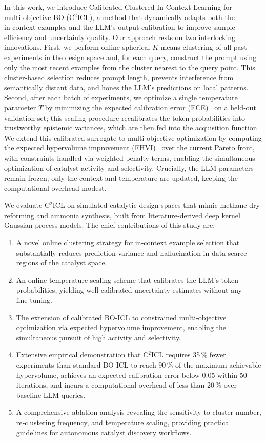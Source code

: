 \documentclass{article}
\begin{document}
In this work, we introduce Calibrated Clustered In‑Context Learning for multi‑objective BO (C$^2$ICL), a method that dynamically adapts both the in‑context examples and the LLM’s output calibration to improve sample efficiency and uncertainty quality. Our approach rests on two interlocking innovations. First, we perform online spherical $K$-means clustering of all past experiments in the design space and, for each query, construct the prompt using only the most recent examples from the cluster nearest to the query point. This cluster‑based selection reduces prompt length, prevents interference from semantically distant data, and hones the LLM’s predictions on local patterns. Second, after each batch of experiments, we optimize a single temperature parameter $T$ by minimizing the expected calibration error (ECE)~\cite{naeini2015obtaining} on a held‑out validation set; this scaling procedure recalibrates the token probabilities into trustworthy epistemic variances, which are then fed into the acquisition function. We extend this calibrated surrogate to multi‑objective optimization by computing the expected hypervolume improvement (EHVI)~\cite{yang2019multiobjective} over the current Pareto front, with constraints handled via weighted penalty terms, enabling the simultaneous optimization of catalyst activity and selectivity. Crucially, the LLM parameters remain frozen; only the context and temperature are updated, keeping the computational overhead modest.  

We evaluate C$^2$ICL on simulated catalytic design spaces that mimic methane dry reforming and ammonia synthesis, built from literature‑derived deep kernel Gaussian process models. The chief contributions of this study are:  

\begin{enumerate}
    \item A novel online clustering strategy for in‑context example selection that substantially reduces prediction variance and hallucination in data‑scarce regions of the catalyst space.
    \item An online temperature scaling scheme that calibrates the LLM’s token probabilities, yielding well‑calibrated uncertainty estimates without any fine‑tuning.
    \item The extension of calibrated BO‑ICL to constrained multi‑objective optimization via expected hypervolume improvement, enabling the simultaneous pursuit of high activity and selectivity.
    \item Extensive empirical demonstration that C$^2$ICL requires 35\,\% fewer experiments than standard BO‑ICL to reach 90\,\% of the maximum achievable hypervolume, achieves an expected calibration error below 0.05 within 50 iterations, and incurs a computational overhead of less than 20\,\% over baseline LLM queries.
    \item A comprehensive ablation analysis revealing the sensitivity to cluster number, re‑clustering frequency, and temperature scaling, providing practical guidelines for autonomous catalyst discovery workflows.
\end{enumerate}
\end{document}
